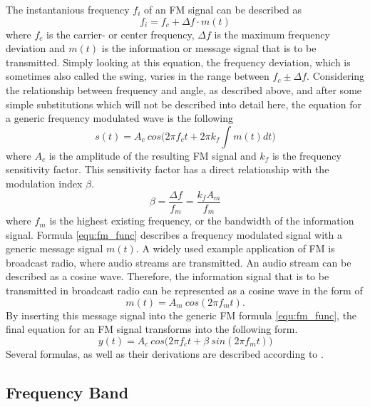 The instantanious frequency $f_i$ of an FM signal can be described as
\begin{equation}
  f_i = f_c + \Delta f \cdot m(t)
\end{equation}
where $f_c$ is the carrier- or center frequency, $\Delta f$ is the maximum frequency deviation and $m(t)$ is the information or message signal that is to be transmitted.
Simply looking at this equation, the frequency deviation, which is sometimes also called the swing, varies in the range between $f_c \pm \Delta f$.
Considering the relationship between frequency and angle, as described above, and after some simple substitutions which will not be described into detail here, the equation for a generic frequency modulated wave is the following
\begin{equation}
  s(t) = A_c\ cos \Big( 2 \pi f_c t + 2 \pi k_f \int m(t) dt \Big)
  \label{equ:fm_func}
\end{equation}
where $A_c$ is the amplitude of the resulting FM signal and $k_f$ is the frequency sensitivity factor.
This sensitivity factor has a direct relationship with the modulation index $\beta$.
\begin{equation}
  \beta = \frac{\Delta f}{f_m} = \frac{k_f A_m}{f_m}
\end{equation}
where $f_m$ is the highest existing frequency, or the bandwidth of the information signal.
Formula \eqref{equ:fm_func} describes a frequency modulated signal with a generic message signal $m(t)$.
A widely used example application of FM is broadcast radio, where audio streams are transmitted.
An audio stream can be described as a cosine wave.
Therefore, the information signal that is to be transmitted in broadcast radio can be represented as a cosine wave in the form of
\begin{equation}
  m(t) = A_m\ cos(2 \pi f_m t).
\end{equation}
By inserting this message signal into the generic FM formula \eqref{equ:fm_func}, the final equation for an FM signal transforms into the following form.
\begin{equation}
  y(t) = A_c\ cos \Big(2 \pi f_c t + \beta\ sin(2 \pi f_m t)\Big )
\end{equation}
Several formulas, as well as their derivations are described according to \cite[pg.54-55]{MatinMohammadA2018CSfE}.

\subsection{Frequency Band}
\label{sec:FrequencyBand}

